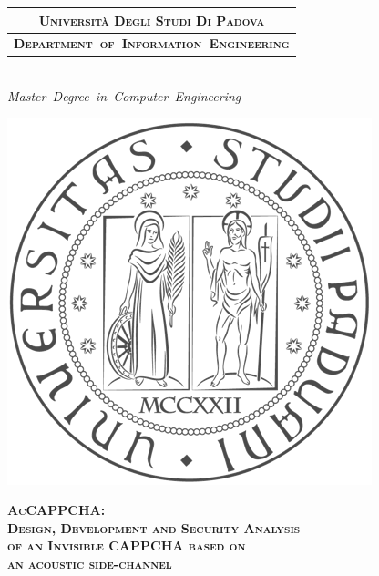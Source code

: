 \addtolength{\oddsidemargin}{-0.7cm}
\begin{titlepage} %
\begin{center}
\begin{minipage}{\textwidth}
\begin{center}
  \begin{table}[H]
  \centering  
  \begin{tabular}{p{\textwidth}}
  \multicolumn{1}{c}{\scshape{\bfseries{\large{Università Degli Studi Di Padova}}}}\\
  \hline
  \multicolumn{1}{c}{\scshape{\bfseries{\large{Department~of~Information~Engineering}}}}\\
  \end{tabular}
  \end{table}
\end{center}
\end{minipage}\\
\Large{\textit{Master~Degree~in~Computer~Engineering}} \\
\vspace{0.5cm}
\begin{minipage}{.25\textwidth}
  \includegraphics[width=\textwidth]{./Images/unipd-bn}
\end{minipage}

\vspace{1.0cm}
\scshape{\Large{\bfseries{AcCAPPCHA:\\}}}
\scshape{\large{\bfseries{Design, Development and Security Analysis\\}}}
\scshape{\large{\bfseries{of an Invisible CAPPCHA based on\\}}}
\scshape{\large{\bfseries{an acoustic side-channel\\}}}
\vspace{0.2cm} \linespread{1} 
\scshape{\large{\bfseries{}}}
\end{center}


\end{titlepage}
